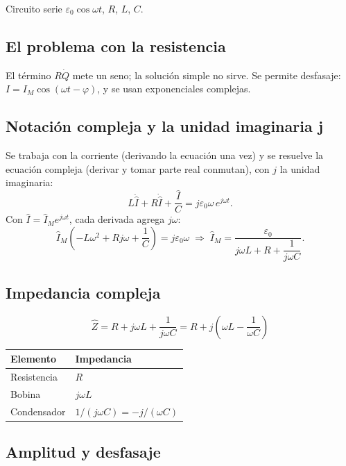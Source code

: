 \documentclass[12pt,a4paper]{article}
\begin{document}
Circuito serie $\varepsilon_0\cos\omega t$, $R$, $L$, $C$.

\subsection{El problema con la resistencia}

El término $R\dot Q$ mete un seno; la solución simple no sirve. Se permite
desfasaje: $I = I_M\cos(\omega t - \varphi)$, y se usan exponenciales
complejas.

\subsection{Notación compleja y la unidad imaginaria j}

Se trabaja con la corriente (derivando la ecuación una vez) y se resuelve la
ecuación compleja (derivar y tomar parte real conmutan), con $j$ la unidad
imaginaria:
\[
L\ddot{\hat I} + R\dot{\hat I} + \frac{\hat I}{C} = j\varepsilon_0\omega\,
e^{j\omega t}.
\]
Con $\hat I = \hat I_M e^{j\omega t}$, cada derivada agrega $j\omega$:
\[
\hat I_M\left(-L\omega^2 + Rj\omega + \frac{1}{C}\right) = j\varepsilon_0\omega
\;\Longrightarrow\;
\hat I_M = \frac{\varepsilon_0}{j\omega L + R + \dfrac{1}{j\omega C}}.
\]

\subsection{Impedancia compleja}

\begin{keybox}
  \[
  \boxed{\hat Z = R + j\omega L + \frac{1}{j\omega C}
        = R + j\left(\omega L - \frac{1}{\omega C}\right)}
  \]
\end{keybox}

\begin{center}
\begin{tabular}{@{}ll@{}}
\toprule
Elemento & Impedancia \\
\midrule
Resistencia & $R$ \\
Bobina & $j\omega L$ \\
Condensador & $1/(j\omega C) = -j/(\omega C)$ \\
\bottomrule
\end{tabular}
\end{center}

\subsection{Amplitud y desfasaje}
\end{document}
